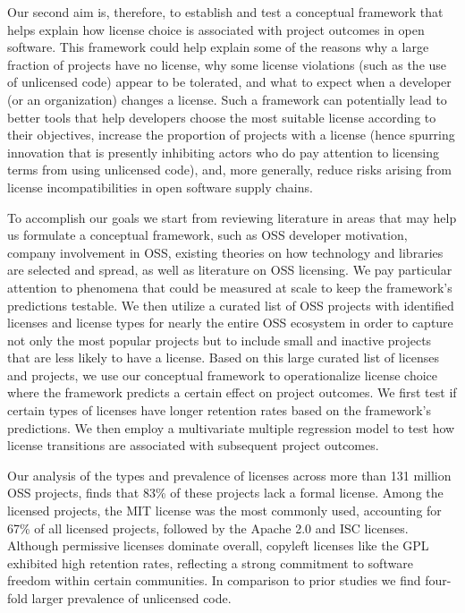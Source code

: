 Our second aim is, therefore, to establish and test a conceptual framework
that helps explain how license choice is associated with project
outcomes in open software.
This framework could help explain some of the reasons why a large
fraction of projects have no license, why some license violations (such
as the use of unlicensed code) appear to be tolerated, and what to
expect when a developer (or an organization) changes a license.
Such a framework can potentially lead to better tools that help developers
choose the most suitable license according to their objectives,
increase the proportion of projects with a license (hence spurring
innovation that is presently inhibiting actors who do pay attention
to licensing terms from using unlicensed code), and, more generally,
reduce risks arising from license incompatibilities in open software supply
chains.

To accomplish our goals we start from reviewing literature in areas
that may help us formulate a conceptual framework, such as OSS developer
motivation, company involvement in OSS, existing theories on how
technology and libraries are selected and spread, as well as
literature on OSS licensing. 
We pay particular attention to phenomena that could be measured at
scale to keep the framework's predictions testable.
We then utilize a curated list of OSS projects with identified licenses 
and license types for nearly the entire OSS ecosystem in order 
to capture not only the most
popular projects but to include small and inactive projects that are
less likely to have a license. 
Based on this large curated list of
licenses and projects, we use our conceptual framework to
operationalize license choice where the framework predicts a certain effect
on project outcomes.
We first test if certain types of licenses have longer
retention rates based on the framework's predictions.
We then employ a multivariate multiple regression model to test 
how license transitions are associated with subsequent project outcomes.

Our analysis of the types and prevalence of licenses across more
than 131 million OSS projects, finds that 83\% of these projects
lack a formal license. Among the licensed projects, the MIT license
was the most commonly used, accounting for 67\% of all licensed
projects, followed by the Apache 2.0 and ISC licenses.  Although
permissive licenses dominate overall, copyleft licenses like the GPL
exhibited high retention rates, reflecting a strong commitment to
software freedom within certain communities. In comparison to prior
studies we find four-fold larger prevalence of unlicensed
code.

